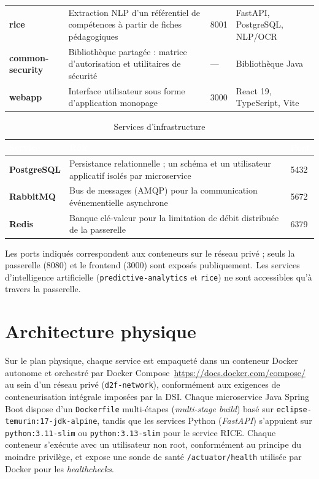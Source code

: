 \documentclass[12pt,a4paper]{report}
\renewcommand{\thead}[1]{\cellcolor{espritblue}\textcolor{white}{\textbf{#1}}}
\begin{document}
\begin{table}[H]
{\begin{tabularx}{\textwidth}{>{\bfseries}p{3cm} X p{1.2cm} p{3.1cm}}
rice & Extraction NLP d'un référentiel de compétences à partir de fiches pédagogiques & 8001 & FastAPI, PostgreSQL, NLP/OCR \\
common-security & Bibliothèque partagée : matrice d'autorisation et utilitaires de sécurité & — & Bibliothèque Java \\
webapp & Interface utilisateur sous forme d'application monopage & 3000 & React 19, TypeScript, Vite \\
\bottomrule
\end{tabularx}}
\end{table}

\begin{table}[H]
\centering
\caption{Services d'infrastructure}
\label{tab:infra}
{\small\renewcommand{\arraystretch}{1.15}
\begin{tabularx}{\textwidth}{>{\bfseries}p{2.6cm} X p{1.2cm}}
\toprule
\normalfont\thead{Service} & \thead{Rôle} & \thead{Port} \\
\midrule
PostgreSQL & Persistance relationnelle ; un schéma et un utilisateur applicatif isolés par microservice & 5432 \\
RabbitMQ & Bus de messages (AMQP) pour la communication événementielle asynchrone & 5672 \\
Redis & Banque clé-valeur pour la limitation de débit distribuée de la passerelle & 6379 \\
\bottomrule
\end{tabularx}}
\end{table}

\noindent Les ports indiqués correspondent aux conteneurs sur le réseau
privé ; seuls la passerelle (8080) et le frontend (3000) sont exposés
publiquement. Les services d'intelligence artificielle
(\texttt{predictive-analytics} et \texttt{rice}) ne sont accessibles qu'à
travers la passerelle.

\section{Architecture physique}

Sur le plan physique, chaque service est empaqueté dans un conteneur Docker
autonome et orchestré par Docker Compose~\url{https://docs.docker.com/compose/} au sein d'un
réseau privé (\texttt{d2f-network}), conformément aux exigences de
conteneurisation intégrale imposées par la DSI. Chaque microservice Java
Spring Boot dispose d'un \texttt{Dockerfile} multi-étapes
(\textit{multi-stage build}) basé sur
\texttt{eclipse-temurin:17-jdk-alpine}, tandis que les services Python
(\textit{FastAPI}) s'appuient sur \texttt{python:3.11-slim} ou
\texttt{python:3.13-slim} pour le service RICE. Chaque conteneur s'exécute
avec un utilisateur non root, conformément au principe du moindre
privilège, et expose une sonde de santé \texttt{/actuator/health} utilisée
par Docker pour les \textit{healthchecks}.
\end{document}
